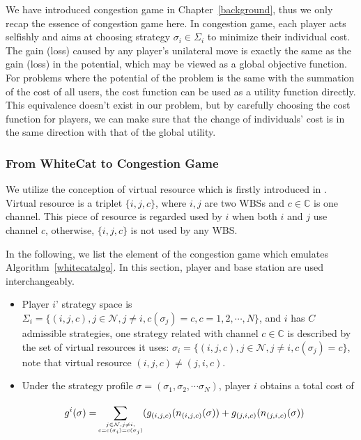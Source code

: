 \documentclass[times]{ettauth}
\theoremstyle{mytheoremstyle}
\theoremstyle{mytheoremstyle}
\theoremstyle{mytheoremstyle}
\begin{document}
%
%
We have introduced congestion game in Chapter~\ref{background}, thus we only recap the essence of congestion game here.
In congestion game, each player acts selfishly and aims at choosing strategy $\sigma_i\in \Sigma_i$ to minimize their individual cost.
The gain (loss) caused by any player's unilateral move is exactly the same as the gain (loss) in the potential, which may be viewed as a global objective function.
For problems where the potential of the problem is the same with the summation of the cost of all users, the cost function can be used as a utility function directly.
This equivalence doesn't exist in our problem, but by carefully choosing the cost function for players, we can make sure that the change of individuals' cost is in the same direction with that of the global utility.



\subsubsection{From WhiteCat to Congestion Game}
\label{gameforproblem}
We utilize the conception of virtual resource which is firstly introduced in \cite{allerton08_liu}. 
Virtual resource is a triplet $\{i, j, c\}$, where $i,j$ are two WBSs and $c\in \mathbb{C}$ is one channel.
This piece of resource is regarded used by $i$ when both $i$ and $j$ use channel $c$, otherwise, $\{i, j, c\}$ is not used by any WBS.

In the following, we list the element of the congestion game which emulates Algorithm~\ref{whitecatalgo}.
In this section, player and base station are used interchangeably.

\begin{itemize}
\item Player $i$' strategy space is $\Sigma_i=\{(i,j,c), j\in \mathcal{N}, j\ne i, c(\sigma_j)=c, c=1,2,\cdots,N\}$, and $i$ has $C$ admissible strategies, one strategy related with channel $c\in\mathbb{C}$ is described by the set of virtual resources it uses: $\sigma_i=\{(i,j,c), j\in \mathcal{N}, j\ne i, c(\sigma_j)=c\}$, note that virtual resource $(i,j,c)\neq(j,i,c)$.

\item Under the strategy profile $\sigma=(\sigma_1, \sigma_2, \cdots \sigma_N)$, player $i$ obtains a total cost of 

	\begin{equation}
\label{6}
		\begin{split}
		g^i(\sigma)=
		& \sum\limits^{}_{\tiny\substack{j\in \mathcal{N},j\neq i,\\ c=c(\sigma_i)=c(\sigma_j)}} (g_{(i,j,c)}(n_{(i,j,c)}(\sigma))+g_{(j,i,c)}(n_{(j,i,c)}(\sigma))
		\end{split}
		\end{equation}
\end{itemize}
\end{document}
